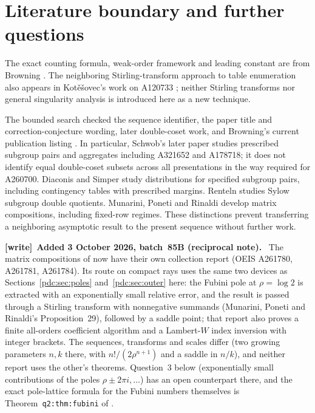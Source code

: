 \documentclass[11pt,letterpaper]{article}
\theoremstyle{remark}\newtheorem{remark}[theorem]{Remark}
\newenvironment{writenote}[1][]{\par\smallskip\begingroup\small
 \noindent\textbf{[write]}\if\relax\detokenize{#1}\relax\else~\textbf{#1.}\fi\ }%
 {\par\endgroup\smallskip}
\begin{document}
\section{Literature boundary and further questions}
\label{pdc:sec:literature}
The exact counting formula, weak-order framework and leading constant are from Browning \cite{browning}. The neighboring Stirling-transform approach to table enumeration also appears in Kot\v{e}\v{s}ovec's work on A120733 \cite{kotesovec}; neither Stirling transforms nor general singularity analysis is introduced here as a new technique.

The bounded search checked the sequence identifier, the paper title and correction-conjecture wording, later double-coset work, and Browning's current publication listing \cite{writings}. In particular, Schwob's later paper \cite{schwob} studies prescribed subgroup pairs and aggregates including A321652 and A178718; it does not identify equal double-coset subsets across all presentations in the way required for A260700. Diaconis and Simper \cite{diaconis} study distributions for specified subgroup pairs, including contingency tables with prescribed margins. Renteln \cite{renteln} studies Sylow subgroup double quotients. Munarini, Poneti and Rinaldi \cite{matrix} develop matrix compositions, including fixed-row regimes. These distinctions prevent transferring a neighboring asymptotic result to the present sequence without further work.

\begin{writenote}[Added 3 October 2026, batch~85B (reciprocal note)]
The matrix compositions of \cite{matrix} now have their own collection
report \cite{pdc-mxc} (OEIS A261780, A261781, A261784). Its route on
compact rays uses the same two devices as Sections~\ref{pdc:sec:poles}
and~\ref{pdc:sec:outer} here: the Fubini pole at $\rho=\log2$ is
extracted with an exponentially small relative error, and the result is
passed through a Stirling transform with nonnegative summands
(Munarini, Poneti and Rinaldi's Proposition~29), followed by a saddle
point; that report also proves a finite all-orders coefficient algorithm
and a Lambert-$W$ index inversion with integer brackets. The sequences,
transforms and scales differ (two growing parameters $n,k$ there, with
$n!/(2\rho^{n+1})$ and a saddle in $n/k$), and neither report uses the
other's theorems. Question~3 below (exponentially small contributions of
the poles $\rho\pm2\pi i,\ldots$) has an open counterpart there, and the
exact pole-lattice formula for the Fubini numbers themselves is
Theorem~\texttt{q2:thm:fubini} of \cite{pdc-tai}.
\end{writenote}
\end{document}
